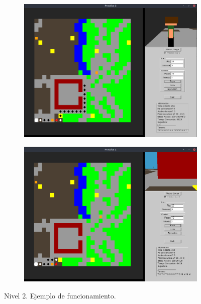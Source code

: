 \documentclass[12pt,spanish]{article}
\begin{document}
\begin{figure}[H]
\centering
\begin{subfigure}[H]{0.85\textwidth}
\includegraphics[width=\textwidth]{nivel_2_1.png}
\end{subfigure}
\vspace{1cm}
\begin{subfigure}[H]{0.85\textwidth}
\includegraphics[width=\textwidth]{nivel_2_2.png}
\end{subfigure}
\caption{Nivel 2. Ejemplo de funcionamiento.}
\end{figure}
\end{document}
